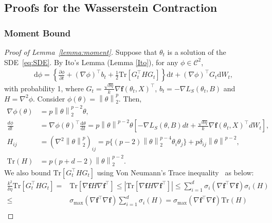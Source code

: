 \documentclass{article}
\newcommand{\norm}[1]{\left\lVert#1\right\rVert} %
\begin{document}
\subsection{Proofs for the Wasserstein Contraction }

\subsubsection{Moment Bound}

\begin{proof}[Proof of Lemma~\ref{lemma:moment}]
	Suppose that $\theta_t$ is a solution of the SDE~\eqref{eq:SDE}. By Ito's Lemma (Lemma \ref{Ito}), for any $\phi \in \mathcal{C}^2$,
	\begin{align*}
		\mathrm{d}\phi = \left\{\frac{\partial \phi}{\partial t} + (\nabla \phi)^\top b_t + \frac{1}{2} \textrm{Tr} [G_t^\top H G_t] \right\} \mathrm{d}t + (\nabla \phi)^\top G_t \mathrm{d}W_t,
	\end{align*}
	with probability 1, where $G_t = \frac{\sqrt{\delta \eta}}{k} \nabla \textbf{f}(\theta_t, X)^\top$, $b_t = -\nabla L_S(\theta_t, B)$ and $H = \nabla^2 \phi$.
	Consider $\phi(\theta) = \norm{\theta}_2^p$. Then,  
	\begin{align*}
		\nabla \phi(\theta) &= p \norm{\theta}_2^{p-2} \theta,\\
		\frac{d\phi}{dt} &= \nabla_{} \phi(\theta)^\top \frac{\mathrm{d}\theta}{\mathrm{d}t}
		= p\norm{\theta}^{p-2} \theta \left[ - \nabla L_S(\theta, B) dt + \frac{\sqrt{\delta \eta}}{k} \nabla \textbf{f}(\theta_t, X)^\top dW_t \right],\\
		H_{ij} &= (\nabla^2 \norm{\theta}_2^p)_{ij} = p\{(p-2)\norm{\theta}_2^{p-4} \theta_i \theta_j \} + p \delta_{ij} \norm{\theta}^{p-2}, \\
		\mathrm{Tr} (H) &= p(p+d-2)\norm{\theta}_2^{p-2}.
	\end{align*}
	We also bound $\textrm{Tr} [G_t^\top H G_t]$ using Von Neumann's Trace inequality~\citep{Mirsky} as below:
	\begingroup
	\allowdisplaybreaks
	\begin{align*}
		\!\!\frac{k^2}{\delta \eta}\mathrm{Tr}[G_t^\top H G_t]\!=& \mathrm{Tr}[\nabla \mathbf{f} H \nabla \mathbf{f}^\top]\!\leq\!  |\mathrm{Tr}[\nabla \mathbf{f} H \nabla \mathbf{f}^\top]|
		\!\leq\! \sum_{i=1}^{d} \sigma_i (\nabla \mathbf{f}^\top \nabla \mathbf{f} ) \sigma_i (H) \tag{by Von Neumann's Trace inequality}\\
		\leq& \sigma_{\max} (\nabla \mathbf{f}^\top \nabla \mathbf{f}) \sum_{i=1}^{d} \sigma_i (H) = \sigma_{\max} (\nabla \mathbf{f}^\top \nabla \mathbf{f}) \mathrm{Tr}(H) \tag{since $H = H^\top$ and $H \succeq 0$}\\

\end{align*}
\end{proof}
\end{document}
